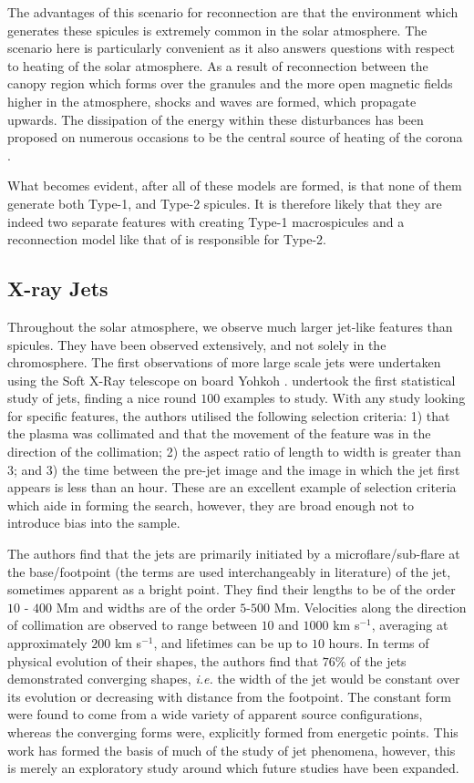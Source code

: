 The advantages of this scenario for reconnection are that the environment which generates these spicules is extremely common in the solar atmosphere.
The scenario here is particularly convenient as it also answers questions with respect to heating of the solar atmosphere.
As a result of reconnection between the canopy region which forms over the granules and the more open magnetic fields higher in the atmosphere, shocks and waves are formed, which propagate upwards.
The dissipation of the energy within these disturbances has been proposed on numerous occasions to be the central source of heating of the corona \cite{Klimchuk2012, Kudoh1999, Athay2000}. 

What becomes evident, after all of these models are formed, is that none of them generate both Type-1, and Type-2 spicules.
It is therefore likely that they are indeed two separate features with \cite{DePointeu2004} creating Type-1 macrospicules and a reconnection model like that of \cite{Moore2011spic_recon} is responsible for Type-2.

\subsection{X-ray Jets}
Throughout the solar atmosphere, we observe much larger jet-like features than spicules.
They have been observed extensively, and not solely in the chromosphere.
The first observations of more large scale jets were undertaken using the Soft X-Ray telescope on board Yohkoh \cite{Tsuneta1991}.
\cite{Shimojo1996} undertook the first statistical study of jets, finding a nice round $100$ examples to study.
With any study looking for specific features, the authors utilised the following selection criteria: 1) that the plasma was collimated and that the movement of the feature was in the direction of the collimation; 2) the aspect ratio of length to width is greater than $3$; and 3) the time between the pre-jet image and the image in which the jet first appears is less than an hour.
These are an excellent example of selection criteria which aide in forming the search, however, they are broad enough not to introduce bias into the sample.

The authors find that the jets are primarily initiated by a microflare/sub-flare at the base/footpoint (the terms are used interchangeably in literature) of the jet, sometimes apparent as a bright point.
They find their lengths to be of the order $10$ - $400$ Mm and widths are of the order $5$-$500$ Mm.
Velocities along the direction of collimation are observed to range between $10$ and $1000$ km s$^{-1}$, averaging at approximately $200$ km s$^{-1}$, and lifetimes can be up to $10$ hours.
In terms of physical evolution of their shapes, the authors find that $76\%$ of the jets demonstrated converging shapes, \emph{i.e.} the width of the jet would be constant over its evolution or decreasing with distance from the footpoint. 
The constant form were found to come from a wide variety of apparent source configurations, whereas the converging forms were, explicitly formed from energetic points.
This work has formed the basis of much of the study of jet phenomena, however, this is merely an exploratory study around which future studies have been expanded.

